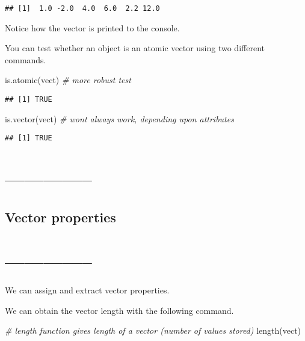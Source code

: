 \documentclass[
]{article}
\newenvironment{Shaded}{\begin{snugshade}}{\end{snugshade}}
\newcommand{\CommentTok}[1]{\textcolor[rgb]{0.56,0.35,0.01}{\textit{#1}}}
\newcommand{\FunctionTok}[1]{\textcolor[rgb]{0.00,0.00,0.00}{#1}}
\newcommand{\NormalTok}[1]{#1}
\begin{document}
\begin{verbatim}
## [1]  1.0 -2.0  4.0  6.0  2.2 12.0
\end{verbatim}

Notice how the vector is printed to the console.

You can test whether an object is an atomic vector using two different
commands.

\begin{Shaded}
\begin{Highlighting}[]
\FunctionTok{is.atomic}\NormalTok{(vect)   }\CommentTok{\# more robust test}
\end{Highlighting}
\end{Shaded}

\begin{verbatim}
## [1] TRUE
\end{verbatim}

\begin{Shaded}
\begin{Highlighting}[]
\FunctionTok{is.vector}\NormalTok{(vect)   }\CommentTok{\# won\textquotesingle{}t always work, depending upon attributes}
\end{Highlighting}
\end{Shaded}

\begin{verbatim}
## [1] TRUE
\end{verbatim}

\hypertarget{section-18}{%
\section{--------------}\label{section-18}}

\hypertarget{vector-properties}{%
\subsection{Vector properties}\label{vector-properties}}

\hypertarget{section-19}{%
\section{--------------}\label{section-19}}

We can assign and extract vector properties.

We can obtain the vector length with the following command.

\begin{Shaded}
\begin{Highlighting}[]
\CommentTok{\# length function gives length of a vector (number of values stored)}
\FunctionTok{length}\NormalTok{(vect)}
\end{Highlighting}
\end{Shaded}
\end{document}
